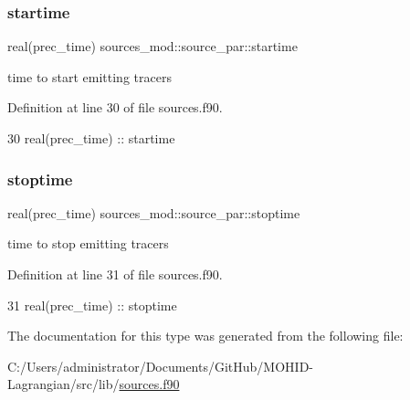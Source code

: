 \subsubsection{\texorpdfstring{startime}{startime}}
{\footnotesize\ttfamily real(prec\+\_\+time) sources\+\_\+mod\+::source\+\_\+par\+::startime\hspace{0.3cm}{\ttfamily [private]}}



time to start emitting tracers 



Definition at line 30 of file sources.\+f90.


\begin{DoxyCode}
30         \textcolor{keywordtype}{real(prec\_time)} :: startime
\end{DoxyCode}
\mbox{\label{structsources__mod_1_1source__par_ac2c04f0d36ad034e160e3de15fe0c283}} 
\subsubsection{\texorpdfstring{stoptime}{stoptime}}
{\footnotesize\ttfamily real(prec\+\_\+time) sources\+\_\+mod\+::source\+\_\+par\+::stoptime\hspace{0.3cm}{\ttfamily [private]}}



time to stop emitting tracers 



Definition at line 31 of file sources.\+f90.


\begin{DoxyCode}
31         \textcolor{keywordtype}{real(prec\_time)} :: stoptime
\end{DoxyCode}


The documentation for this type was generated from the following file\+:\begin{DoxyCompactItemize}
\item 
C\+:/\+Users/administrator/\+Documents/\+Git\+Hub/\+M\+O\+H\+I\+D-\/\+Lagrangian/src/lib/\mbox{\hyperlink{sources_8f90}{sources.\+f90}}\end{DoxyCompactItemize}

